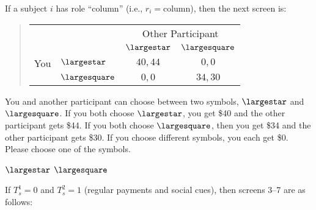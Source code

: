 \documentclass[11pt]{article}
\begin{document}
If a subject $i$ has role ``column'' (i.e., $r_i=\text{column}$), then the next screen is:
\begin{tcolorbox}
\begin{quote}
\begin{center}
\begin{tabular}{llcc}
    & & \multicolumn{2}{c}{Other Participant}  \\
& & $\largestar$ & $\largesquare$  \\ \cline{3-4}
You & $\largestar$ & \multicolumn{1}{|c|}{$40,44$} & \multicolumn{1}{c|}{$0,0$}  \\ \cline{3-4}
& $\largesquare$ & \multicolumn{1}{|c|}{$0,0$} & \multicolumn{1}{c|}{$34,30$}  \\ \cline{3-4}
\end{tabular}
\end{center}
\end{quote}

You and another participant can choose between two symbols, $\largestar$ and $\largesquare$. If you both choose $\largestar$, you get \$40 and the other participant gets \$44. If you both choose $\largesquare$, then you get \$34 and the other participant gets \$30. If you choose different symbols, you each get \$0.\\

Please choose one of the symbols.\\


\begin{center}
$\largestar$ \qquad $\largesquare$
\end{center}
\end{tcolorbox}

If $T_s^1=0$ and $T_s^2=1$ (regular payments and social cues), then screens 3--7 are as follows:
\end{document}
